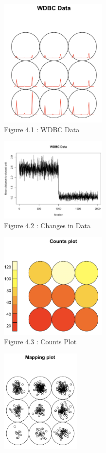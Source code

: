 \documentclass[11pt]{article}
\begin{document}
\begin{enumerate}
 \begin{center}
    \includegraphics[width=0.4\textwidth]{4_A.png}
    \\\footnotesize Figure 4.1 : WDBC Data
\end{center}
\begin{center}
    \includegraphics[width=0.4\textwidth]{4_B.png}
    \\\footnotesize Figure 4.2 : Changes in Data
\end{center}
\begin{center}
    \includegraphics[width=0.4\textwidth]{4_C.png}
    \\\footnotesize Figure 4.3 : Counts Plot
\end{center}
\begin{center}
    \includegraphics[width=0.3\textwidth]{4_D.png}

\end{center}
\end{enumerate}
\end{document}
